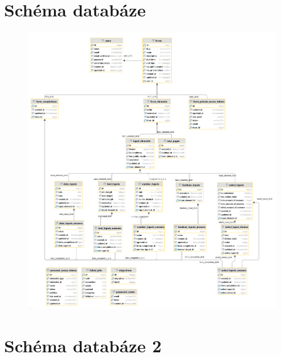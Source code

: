 \chapter{Schéma databáze}
	\begin{figure}[hbtp]
		\centering %
		\includegraphics[height=0.61\paperheight]{img/appendix/db_diagram.png} %
		\label{fig:db_diagram} %
	\end{figure}

	\newpage
\chapter{Schéma databáze 2}

	